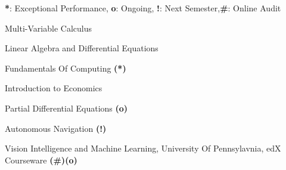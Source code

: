 
\begin{cventries}

  \cventry
    {\textbf{*}: Exceptional Performance,  \textbf{o}: Ongoing,   \textbf{!}: Next Semester,\textbf{\#}: Online Audit}{}{}{}{\begin{cvitems}
        \item {Multi-Variable Calculus}
        \item {Linear Algebra and Differential Equations}
        \item {Fundamentals Of Computing \textbf{(*)}}
        \item {Introduction to Economics}
        \item {Partial Differential Equations \textbf{(o)}}
        \item {Autonomous Navigation \textbf{(!)}}
        \item {Vision Intelligence and Machine Learning, University Of Pennsylavnia, edX Courseware \textbf{(\#)(o)}}
      \end{cvitems}
      }
  \end{cventries}
